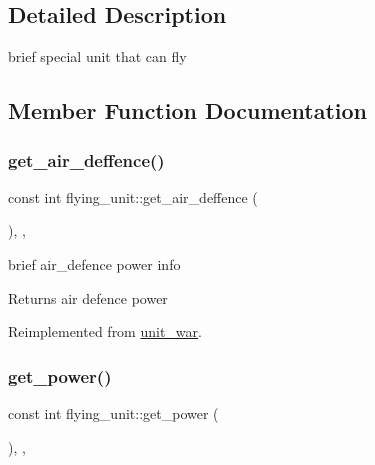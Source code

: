 \subsection{Detailed Description}
brief special unit that can fly 

\subsection{Member Function Documentation}
\mbox{\label{classflying__unit_a47dbbf3832a5b5e8f5365d87cdbfddab}} 
\subsubsection{\texorpdfstring{get\+\_\+air\+\_\+deffence()}{get\_air\_deffence()}}
{\footnotesize\ttfamily const int flying\+\_\+unit\+::get\+\_\+air\+\_\+deffence (\begin{DoxyParamCaption}{ }\end{DoxyParamCaption})\hspace{0.3cm}{\ttfamily [inline]}, {\ttfamily [override]}, {\ttfamily [virtual]}}

brief air\+\_\+defence power info \begin{DoxyReturn}{Returns}
air defence power 
\end{DoxyReturn}


Reimplemented from \mbox{\hyperlink{classunit__war_af26f2da420a828230a329339bc9ef805}{unit\+\_\+war}}.

\mbox{\label{classflying__unit_a95333465a28d47bc5d50427fd3e2cef4}} 
\subsubsection{\texorpdfstring{get\+\_\+power()}{get\_power()}}
{\footnotesize\ttfamily const int flying\+\_\+unit\+::get\+\_\+power (\begin{DoxyParamCaption}{ }\end{DoxyParamCaption})\hspace{0.3cm}{\ttfamily [inline]}, {\ttfamily [override]}, {\ttfamily [virtual]}}


